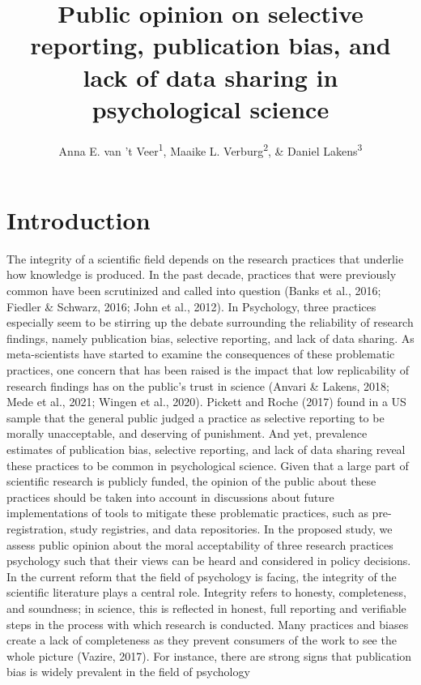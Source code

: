 \documentclass[
  man,floatsintext]{apa7}
\title{Public opinion on selective reporting, publication bias, and lack of data sharing in psychological science}
\author{Anna E. van 't Veer\textsuperscript{1}, Maaike L. Verburg\textsuperscript{2}, \& Daniel Lakens\textsuperscript{3}}
\date{}
\affiliation{\vspace{0.5cm}\textsuperscript{1} Methodology and Statistics Unit, Psychology institute, Leiden University, ORCID: \url{https://orcid.org/0000-0002-2733-1841}\\\textsuperscript{2} ORCID: \url{https://orcid.org/0000-0001-9408-3190}\\\textsuperscript{3} Dept. Industrial Engineering \& Innovation Sciences, Eindhoven University of Technology, ORCID: \url{https://orcid.org/0000-0002-0247-239X}}
\begin{document}
\maketitle

\hypertarget{introduction}{%
\section{Introduction}\label{introduction}}

The integrity of a scientific field depends on the research practices that underlie how
knowledge is produced. In the past decade, practices that were previously common have
been scrutinized and called into question (Banks et al., 2016; Fiedler \& Schwarz, 2016;
John et al., 2012). In Psychology, three practices especially seem to be stirring up the
debate surrounding the reliability of research findings, namely publication bias, selective
reporting, and lack of data sharing. As meta-scientists have started to examine the
consequences of these problematic practices, one concern that has been raised is the
impact that low replicability of research findings has on the public's trust in science (Anvari
\& Lakens, 2018; Mede et al., 2021; Wingen et al., 2020). Pickett and Roche (2017) found
in a US sample that the general public judged a practice as selective reporting to be
morally unacceptable, and deserving of punishment. And yet, prevalence estimates of
publication bias, selective reporting, and lack of data sharing reveal these practices to be
common in psychological science. Given that a large part of scientific research is publicly
funded, the opinion of the public about these practices should be taken into account in
discussions about future implementations of tools to mitigate these problematic practices,
such as pre-registration, study registries, and data repositories. In the proposed study, we
assess public opinion about the moral acceptability of three research practices psychology
such that their views can be heard and considered in policy decisions.
In the current reform that the field of psychology is facing, the integrity of the scientific
literature plays a central role. Integrity refers to honesty, completeness, and soundness; in
science, this is reflected in honest, full reporting and verifiable steps in the process with
which research is conducted. Many practices and biases create a lack of completeness as
they prevent consumers of the work to see the whole picture (Vazire, 2017). For instance,
there are strong signs that publication bias is widely prevalent in the field of psychology
\end{document}
